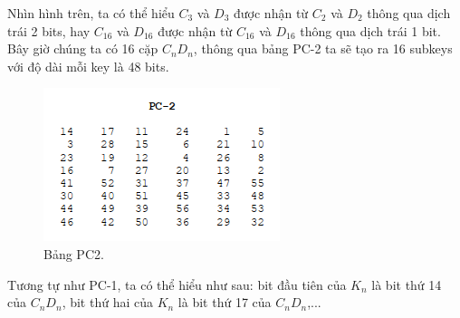 \documentclass[a4paper]{article}
\begin{document}
Nhìn hình trên, ta có thể hiểu $C_3$ và $D_3$ được nhận từ $C_2$ và $D_2$ thông qua dịch trái 2 bits, hay $C_{16}$ và $D_{16}$ được nhận từ $C_{16}$ và $D_{16}$ thông qua dịch trái 1 bit. Bây giờ chúng ta có 16 cặp $C_nD_n$, thông qua bảng PC-2 ta sẽ tạo ra 16 subkeys với độ dài mỗi key là 48 bits.
\begin{figure}[htp]
    \centering
    \includegraphics{PC2.png}
    \caption{Bảng PC2.}
    \label{fig:PC2}
\end{figure}
Tương tự như PC-1, ta có thể hiểu như sau: bit đầu tiên của $K_n$ là bit thứ 14 của $C_nD_n$, bit thứ hai của $K_n$ là bit thứ 17 của $C_nD_n$,...
\end{document}
